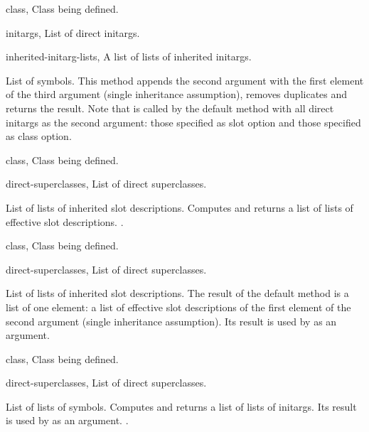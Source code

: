 \begin{optDefinition}
%
\begin{specargs}
    \item[class, \classref{class}] Class being defined.
    \item[initargs, \classref{list}] List of direct initargs.
    \item[inherited-initarg-lists, \classref{list}] A list of lists of inherited initargs.
\end{specargs}
%
\result%
List of symbols.
%
\remarks%
This method appends the second argument with the first element of the third
argument (single inheritance assumption), removes duplicates and returns the
result. Note that  is called by the default
 method with all direct initargs as the second argument:
those specified as slot option and those specified as class option.

%
\begin{genericargs}
    \item[class, \classref{class}] Class being defined.
    \item[direct-superclasses, \classref{list}] List of direct superclasses.
\end{genericargs}
%
\result%
List of lists of inherited slot descriptions.
%
\remarks%
Computes and returns a list of lists of effective slot descriptions.
%
\seealso%
.

%
\begin{specargs}
    \item[class, \classref{class}] Class being defined.
    \item[direct-superclasses, \classref{list}] List of direct superclasses.
\end{specargs}
%
\result%
List of lists of inherited slot descriptions.
%
\remarks%
The result of the default method is a list of one element: a list of effective
slot descriptions of the first element of the second argument (single
inheritance assumption). Its result is used by
 as an argument.

%
\begin{genericargs}
    \item[class, \classref{class}] Class being defined.
    \item[direct-superclasses, \classref{list}] List of direct superclasses.
\end{genericargs}
%
\result%
List of lists of symbols.
\remarks%
Computes and returns a list of lists of initargs. Its result is used by
 as an argument.
%
\seealso%
.


\end{optDefinition}
